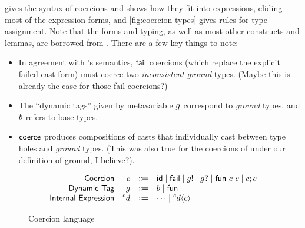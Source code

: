 \documentclass[index.tex]{subfiles}
\begin{document}
 gives the syntax of coercions and shows how they fit into expressions,
eliding most of the expression forms, and \cref{fig:coercion-types} gives rules for type
assignment. Note that the forms and typing, as well as most other constructs and lemmas, are
borrowed from \textcite{herman2010}. There are a few key things to note:
%
\begin{itemize}
  \item In agreement with \HazelnutLive's semantics, $\textsf{fail}$ coercions (which replace the explicit
    failed cast form) must coerce two \emph{inconsistent ground} types. (Maybe this is already the
    case for those fail coercions?)

  \item The ``dynamic tags'' given by metavariable $g$ correspond to \emph{ground} types, and
    $b$ refers to base types.

  \item $\textsf{coerce}$ produces compositions of casts that individually cast between type holes and
    \emph{ground} types. (This was also true for the coercions of \textcite{herman2010} under our
    definition of ground, I believe?).
\end{itemize}

\begin{figure}[htb!]
  \[\begin{array}{rrcl}
    \textsf{Coercion}  & c  & \Coloneqq & \textsf{id} \mid \textsf{fail}
                                 \mid g! \mid g? 
                                 \mid \textsf{fun} ~c ~c \mid c; c \\
    \textsf{Dynamic Tag} & g & \Coloneqq & b \mid \textsf{fun} \\
    \textsf{Internal Expression} & \prescript{c}{}{d} & \Coloneqq & \cdots \mid \prescript{c}{}{d} \langle c \rangle
  \end{array}\]
  \caption{Coercion language}
  \label{fig:coercion-syntax}
\end{figure}
\end{document}
